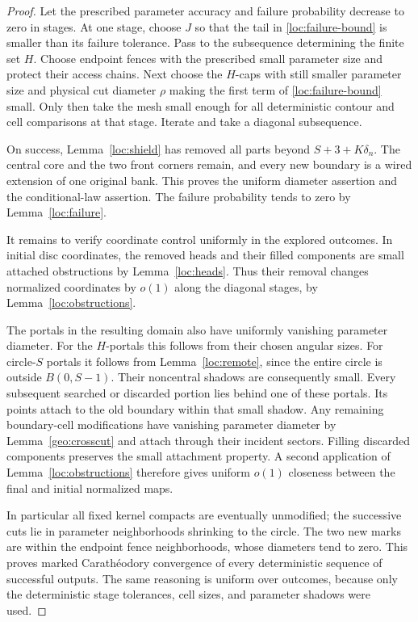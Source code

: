 \begin{proof}
Let the prescribed parameter accuracy and failure
probability decrease to zero in stages. At one stage,
choose \(J\) so that the tail in
\eqref{loc:failure-bound} is smaller than its failure
tolerance. Pass to the subsequence determining the
finite set \(H\). Choose endpoint fences with the
prescribed small parameter size and protect their
access chains. Next choose the \(H\)-caps with
still smaller parameter size and physical cut
diameter \(\rho\) making the first term of
\eqref{loc:failure-bound} small. Only then take
the mesh small enough for all deterministic
contour and cell comparisons at that stage.
Iterate and take a diagonal subsequence.

On success, Lemma~\ref{loc:shield} has removed
all parts beyond \(S+3+K\delta_n\).
The central core and the two front corners
remain, and every new boundary is a wired
extension of one original bank. This proves
the uniform diameter assertion and the
conditional-law assertion. The failure
probability tends to zero by
Lemma~\ref{loc:failure}.

It remains to verify coordinate control
uniformly in the explored outcomes.
In initial disc coordinates, the removed
heads and their filled components are
small attached obstructions by
Lemma~\ref{loc:heads}. Thus their removal
changes normalized coordinates by \(o(1)\)
along the diagonal stages, by
Lemma~\ref{loc:obstructions}.

The portals in the resulting domain also
have uniformly vanishing parameter
diameter. For the \(H\)-portals this follows
from their chosen angular sizes. For
circle-\(S\) portals it follows from
Lemma~\ref{loc:remote}, since the entire
circle is outside \(B(0,S-1)\).
Their noncentral shadows are consequently
small. Every subsequent searched or
discarded portion lies behind one of
these portals. Its points attach to the
old boundary within that small shadow.
Any remaining boundary-cell modifications
have vanishing parameter diameter by
Lemma~\ref{geo:crosscut} and attach
through their incident sectors.
Filling discarded components preserves
the small attachment property.
A second application of
Lemma~\ref{loc:obstructions} therefore
gives uniform \(o(1)\) closeness between
the final and initial normalized maps.

In particular all fixed kernel compacts
are eventually unmodified; the successive
cuts lie in parameter neighborhoods
shrinking to the circle. The two new
marks are within the endpoint fence
neighborhoods, whose diameters tend to
zero. This proves marked Carath\'eodory
convergence of every deterministic
sequence of successful outputs. The
same reasoning is uniform over outcomes,
because only the deterministic stage
tolerances, cell sizes, and parameter
shadows were used.


\end{proof}
